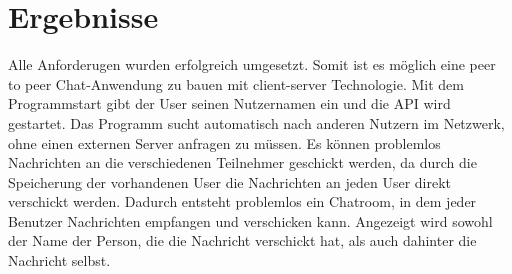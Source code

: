 \section{Ergebnisse}
Alle Anforderugen wurden erfolgreich umgesetzt. 
Somit ist es möglich eine peer to peer Chat-Anwendung zu bauen mit client-server Technologie.
Mit dem Programmstart gibt der User seinen Nutzernamen ein und die API wird gestartet. 
Das Programm sucht automatisch nach anderen Nutzern im Netzwerk, ohne einen externen Server anfragen zu müssen.
Es können problemlos Nachrichten an die verschiedenen Teilnehmer geschickt werden, da durch die Speicherung der vorhandenen User die Nachrichten an jeden User direkt verschickt werden.
Dadurch entsteht problemlos ein Chatroom, in dem jeder Benutzer Nachrichten empfangen und verschicken kann. 
Angezeigt wird sowohl der Name der Person, die die Nachricht verschickt hat, als auch dahinter die Nachricht selbst. 
